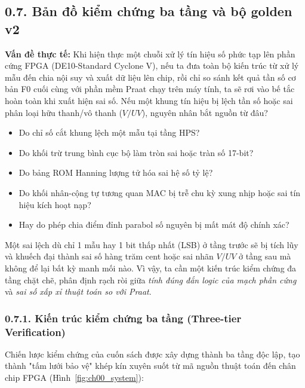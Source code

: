 \subsection*{0.7. Bản đồ kiểm chứng ba tầng và bộ golden v2}

\textbf{Vấn đề thực tế:} Khi hiện thực một chuỗi xử lý tín hiệu số phức tạp lên phần cứng FPGA (DE10-Standard Cyclone V), nếu ta đưa toàn bộ kiến trúc từ xử lý mẫu đến chia nội suy và xuất dữ liệu lên chip, rồi chỉ so sánh kết quả tần số cơ bản F0 cuối cùng với phần mềm Praat chạy trên máy tính, ta sẽ rơi vào bế tắc hoàn toàn khi xuất hiện sai số. Nếu một khung tín hiệu bị lệch tần số hoặc sai phân loại hữu thanh/vô thanh ($V/UV$), nguyên nhân bắt nguồn từ đâu?
\begin{itemize}[leftmargin=1.5em, itemsep=2pt]
    \item Do chỉ số cắt khung lệch một mẫu tại tầng HPS?
    \item Do khối trừ trung bình cục bộ làm tròn sai hoặc tràn số 17-bit?
    \item Do bảng ROM Hanning lượng tử hóa sai hệ số tỷ lệ?
    \item Do khối nhân-cộng tự tương quan MAC bị trễ chu kỳ xung nhịp hoặc sai tín hiệu kích hoạt nạp?
    \item Hay do phép chia điểm đỉnh parabol số nguyên bị mất mát độ chính xác?
\end{itemize}
Một sai lệch dù chỉ 1 mẫu hay 1 bit thấp nhất (LSB) ở tầng trước sẽ bị tích lũy và khuếch đại thành sai số hàng trăm cent hoặc sai nhãn $V/UV$ ở tầng sau mà không để lại bất kỳ manh mối nào. Vì vậy, ta cần một kiến trúc kiểm chứng đa tầng chặt chẽ, phân định rạch ròi giữa \emph{tính đúng đắn logic của mạch phần cứng} và \emph{sai số xấp xỉ thuật toán so với Praat}.

\subsubsection*{0.7.1. Kiến trúc kiểm chứng ba tầng (Three-tier Verification)}
Chiến lược kiểm chứng của cuốn sách được xây dựng thành ba tầng độc lập, tạo thành "tấm lưới bảo vệ" khép kín xuyên suốt từ mã nguồn thuật toán đến chân chip FPGA (Hình~\ref{fig:ch00_system}):

